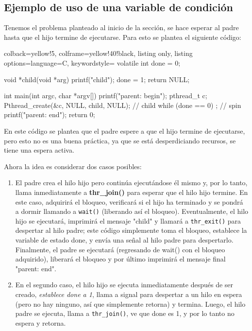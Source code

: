 \documentclass[openany]{book}
\begin{document}
\subsection{Ejemplo de uso de una variable de condición}

Tenemos el problema planteado al inicio de la sección, se hace esperar al padre hasta que el hijo termine de ejecutarse. Para esto se plantea el siguiente código:

\begin{tcblisting}{colback=yellow!5, colframe=yellow!40!black, listing only, listing options={language=C, keywordstyle=\color{blue!35!white}\bfseries}}
volatile int done = 0;

void *child(void *arg) {
    printf("child\n");
    done = 1;
    return NULL;
}

int main(int argc, char *argv[]) {
    printf("parent: begin\n");
    pthread_t c;
    Pthread_create(&c, NULL, child, NULL); // child
    while (done == 0)
        ; // spin
    printf("parent: end\n");
    return 0;
}
\end{tcblisting}    

En este código se plantea que el padre espere a que el hijo termine de ejecutarse, pero esto no es una buena práctica, ya que se está desperdiciando recursos, se tiene una espera activa. 

Ahora la idea es considerar dos casos posibles:
\begin{enumerate}
    \item El padre crea el hilo hijo pero continúa ejecutándose él mismo y, por lo tanto, llama inmediatamente a \textbf{thr\_join()} para esperar que el hilo hijo termine. En este caso, adquirirá el bloqueo, verificará si el hijo ha terminado y se pondrá a dormir llamando a \texttt{wait()} (liberando así el bloqueo). Eventualmente, el hilo hijo se ejecutará, imprimirá el mensaje "child" y llamará a \texttt{thr\_exit()} para despertar al hilo padre; este código simplemente toma el bloqueo, establece la variable de estado done, y envía una señal al hilo padre para despertarlo. Finalmente, el padre se ejecutará (regresando de wait() con el bloqueo adquirido), liberará el bloqueo y por último imprimirá el mensaje final "parent: end".
    \item En el segundo caso, el hilo hijo se ejecuta inmediatamente después de ser creado, \textit{establece done a 1}, llama a signal para despertar a un hilo en espera (pero no hay ninguno, así que simplemente retorna) y termina. Luego, el hilo padre se ejecuta, llama a \texttt{thr\_join()}, ve que done es 1, y por lo tanto no espera y retorna.
\end{enumerate}
\end{document}
